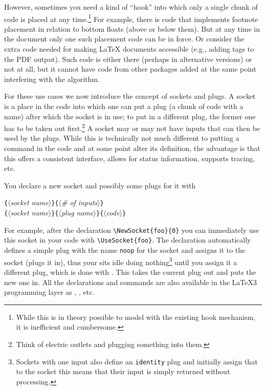 \documentclass{ltnews}
\providecommand\Dash {\unskip \textemdash}
\providecommand\meta[1]{$\langle$\textrm{\itshape#1}$\rangle$}
\providecommand\Arg[1]{\texttt\{\meta{#1}\texttt\}}
\begin{document}
However, sometimes you need a kind of \enquote{hook} into which only a
single chunk of code is placed at any time.\footnote{While this is in
theory possible to model with the existing hook mechanism, it is
inefficient and cumbersome.}  For example, there is code that
implements footnote placement in relation to bottom floats (above or
below them). But at any time in the document only one such placement
code can be in force. Or consider the extra code needed for making
\LaTeX{} documents accessible (e.g., adding tags to the PDF
output). Such code is either there (perhaps in alternative versions)
or not at all, but it cannot have code from other packages added at
the same point interfering with the algorithm.

For these use cases we now introduce the concept of sockets and plugs.
A socket is a place in the code into which one can put a plug (a
chunk of code with a name) after which the socket is in use; to put in
a different plug, the former one has to be taken out
first.\footnote{Think of electric outlets and plugging something into
them.} A socket may or may not have inputs that can then be used by
the plugs.
%
While this is technically not much different to putting a command in
the code and at some point alter its definition, the advantage is that
this offers a consistent interface, allows for status information,
supports tracing, etc.

You declare a new socket and possibly some plugs for it with
\begin{flushleft}
  \Arg{socket name}\Arg{\# of inputs} \\
  \Arg{socket name}\Arg{plug name}\Arg{code}
\end{flushleft}
For example, after the declaration \verb=\NewSocket{foo}{0}= you can
immediately use this socket in your code with \verb=\UseSocket{foo}=.
The  declaration automatically defines a simple plug
with the name \texttt{noop} for the socket and assigns it to the socket
(plugs it in), thus your  sits idle doing
nothing\footnote{Sockets with one input also define an
\texttt{identity} plug and initially assign that to the socket\Dash
this means that their input is simply returned without processing.}
until you assign it a different plug, which is done with
. This takes the current plug out and puts the
new one in.
%
All the declarations and commands are also available in the \LaTeX3
programming layer as , ,
etc.
\end{document}

